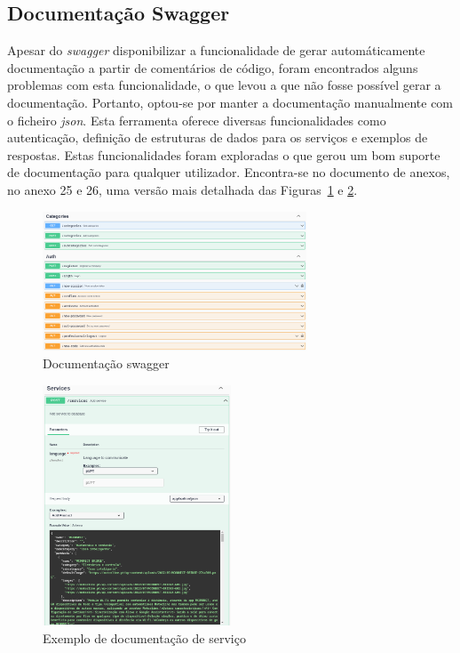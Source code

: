 \newpage

\subsection{Documentação Swagger}
Apesar do \textit{swagger} disponibilizar a funcionalidade de gerar automáticamente documentação a partir de comentários de código, foram encontrados alguns problemas com esta funcionalidade, o que levou a que não fosse possível gerar a documentação. Portanto, optou-se por manter a documentação manualmente com o ficheiro \textit{\acrshort{json}}. Esta ferramenta oferece diversas funcionalidades como autenticação, definição de estruturas de dados para os serviços e exemplos de respostas. Estas funcionalidades foram exploradas o que gerou um bom suporte de documentação para qualquer utilizador.
Encontra-se no documento de anexos, no anexo 25 e 26, uma versão mais detalhada das Figuras~\ref*{fig:67} e \ref*{fig:68}.
\begin{figure}[htb]
 \centering
 \includegraphics[width=0.7\textwidth]{images/implementacao/api/swagger_intro.png}
 \caption{Documentação swagger}
 \label{fig:67}
\end{figure}

\begin{figure}[htb]
 \centering
 \includegraphics[width=0.5\textwidth]{images/implementacao/api/swagger_pedido.png}
 \caption{Exemplo de documentação de serviço}
 \label{fig:68}
\end{figure}